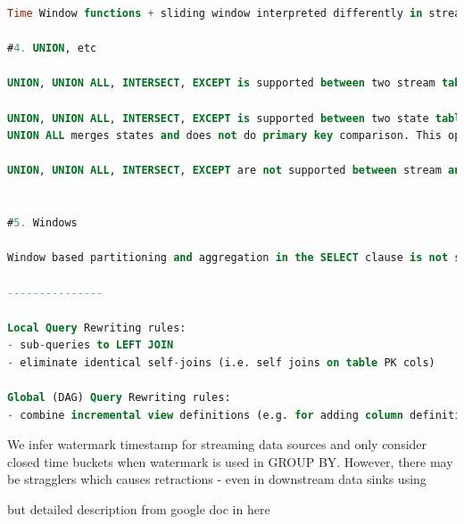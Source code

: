 \documentclass[	DIV=calc,%
							paper=letter,%
							fontsize=11pt,%
							twocolumn]{scrartcl}	 					%
\begin{document}
\begin{lstlisting}[language=SQL]
Time Window functions + sliding window interpreted differently in streaming vs query (need to add watermark filter for window functions, sliding window is not continuous in streaming)

#4. UNION, etc

UNION, UNION ALL, INTERSECT, EXCEPT is supported between two stream tables if they have the same timestamp column. The semantics of these operations are the normal SQL semantics. The special SQL columns _uid, _source_time, _ingest_time are not considered in the comparison, however, the timestamp column always is. The result is a stream with the same timestamp.

UNION, UNION ALL, INTERSECT, EXCEPT is supported between two state tables if they have the same primary key. However, the semantics is different from standard SQL: the comparison is done only on the primary key columns. For UNION, INTERSECT and EXCEPT the non-primary key values of the left hand side are used for columns with the same primary key. These operations preserve the original primary key.
UNION ALL merges states and does not do primary key comparison. This operation extends the primary key by an additional column that keeps track of which table a particular record came from and to ensure that the primary key remains unique.

UNION, UNION ALL, INTERSECT, EXCEPT are not supported between stream and state tables.


#5. Windows

Window based partitioning and aggregation in the SELECT clause is not supported by SQRL.

---------------

Local Query Rewriting rules:
- sub-queries to LEFT JOIN
- eliminate identical self-joins (i.e. self joins on table PK cols)

Global (DAG) Query Rewriting rules:
- combine incremental view definitions (e.g. for adding column definitions) that are chained together in a straight line (i.e. no other dependencies) and don't reference previously defined columns

\end{lstlisting}


We infer watermark timestamp for streaming data sources and only consider closed time buckets when watermark is used in GROUP BY. However, there may be stragglers which causes retractions - even in downstream data sinks using

but detailed description from google doc in here
\end{document}

